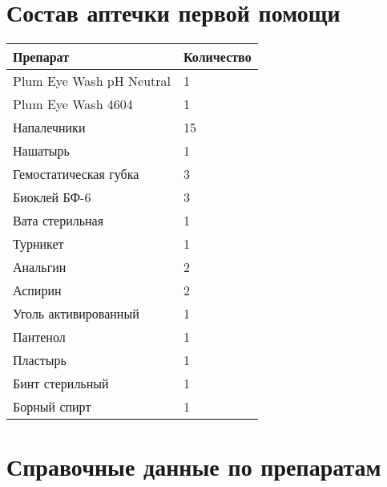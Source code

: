 \documentclass[a4paper,
	twoside,
	russian]{article}
\begin{document}
\section{Состав аптечки первой помощи}

\begin{tabular}{| l | l |}
	\hline
	\textbf{Препарат} & \textbf{Количество} \\ \hline
	Plum Eye Wash pH Neutral & 1 \\ \hline
	Plum Eye Wash 4604 & 1 \\ \hline
	Напалечники & 15 \\ \hline
	Нашатырь & 1 \\ \hline
	Гемостатическая губка & 3 \\ \hline
	Биоклей БФ-6 & 3 \\ \hline
	Вата стерильная & 1 \\ \hline
	Турникет & 1 \\ \hline
	Анальгин & 2 \\ \hline
	Аспирин & 2 \\ \hline
	Уголь активированный & 1 \\ \hline
	Пантенол & 1 \\ \hline
	Пластырь & 1 \\ \hline
	Бинт стерильный & 1 \\ \hline
	Борный спирт & 1 \\ \hline
\end{tabular}


\section{Справочные данные по препаратам}
\end{document}
